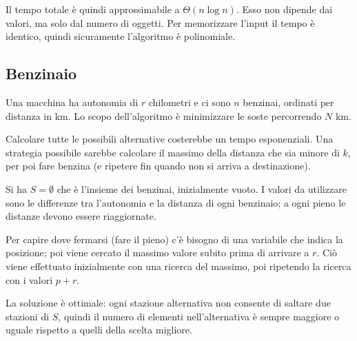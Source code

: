 Il tempo totale è quindi approssimabile a $\Theta(n\log n)$. Esso non dipende dai valori, ma solo dal numero di oggetti. Per memorizzare l'input il tempo è identico, quindi sicuramente l'algoritmo è polinomiale. 

\subsection{Benzinaio}
Una macchina ha autonomia di $r$ chilometri e ci sono $n$ benzinai, ordinati per distanza in km. Lo scopo dell'algoritmo è minimizzare le soste percorrendo $N$ km.

Calcolare tutte le possibili alternative costerebbe un tempo esponenziali. Una strategia possibile sarebbe calcolare il massimo della distanza che sia minore di $k$, per poi fare benzina (e ripetere fin quando non si arriva a destinazione). 

Si ha $S = \emptyset$ che è l'insieme dei benzinai, inizialmente vuoto. I valori da utilizzare sono le differenze tra l'autonomia e la distanza di ogni benzinaio; a ogni pieno le distanze devono essere riaggiornate.

Per capire dove fermarsi (fare il pieno) c'è bisogno di una variabile che indica la posizione; poi viene cercato il massimo valore subito prima di arrivare a $r$. Ciò viene effettuato inizialmente con una ricerca del massimo, poi ripetendo la ricerca con i valori $p + r$. 

La soluzione è ottimale: ogni stazione alternativa non consente di saltare due stazioni di $S$, quindi il numero di elementi nell'alternativa è sempre maggiore o uguale rispetto a quelli della scelta migliore.